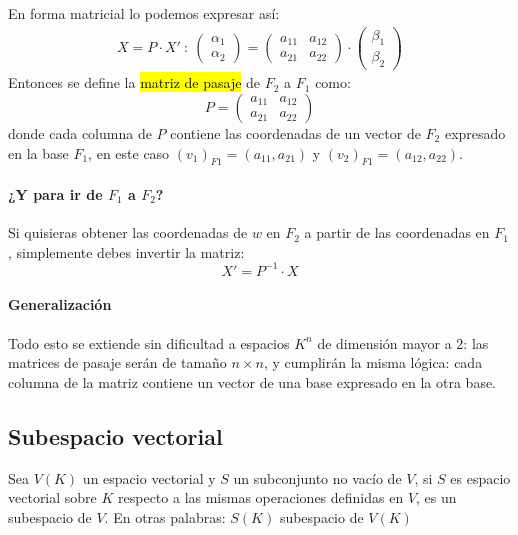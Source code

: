 En forma matricial lo podemos expresar así:
\begin{align*}
  X = P \cdot X' ~ : ~ \begin{pmatrix}
    \alpha_1 \\ \alpha_2
  \end{pmatrix} = \begin{pmatrix}
    a_{11} & a_{12} \\ 
    a_{21} & a_{22}
  \end{pmatrix} \cdot \begin{pmatrix}
    \beta_1 \\ \beta_2
  \end{pmatrix}
\end{align*}
Entonces se define la \hl{matriz de pasaje} de \(F_2\) a \(F_1\) como:
\[
P = 
\begin{pmatrix}
a_{11} & a_{12} \\
a_{21} & a_{22}
\end{pmatrix}
\]
donde cada columna de \(P\) contiene las coordenadas de un vector de \(F_2\) expresado en la base \(F_1\), en este caso \((v_1)_{F1} = (a_{11}, a_{21})\) y \((v_2)_{F1} = (a_{12}, a_{22})\).

\newpage

\paragraph{¿Y para ir de \(F_1\) a \(F_2\)?}

Si quisieras obtener las coordenadas de \(w\) en \(F_2\) a partir de las coordenadas en \(F_1\), simplemente debes invertir la matriz:
\[
X' = P^{-1} \cdot X
\]

\paragraph{Generalización}

Todo esto se extiende sin dificultad a espacios \(K^n\) de dimensión mayor a 2: las matrices de pasaje serán de tamaño \(n\times n\), y cumplirán la misma lógica: cada columna de la matriz contiene un vector de una base expresado en la otra base.

\subsection{Subespacio vectorial}

Sea \(V(K)\) un espacio vectorial y \(S\) un subconjunto no vacío de \(V\), si \(S\) es espacio vectorial sobre \(K\) respecto a las mismas operaciones definidas en \(V\), es un subespacio de \(V\). En otras palabras: \(S(K)\) subespacio de \(V(K)\)


